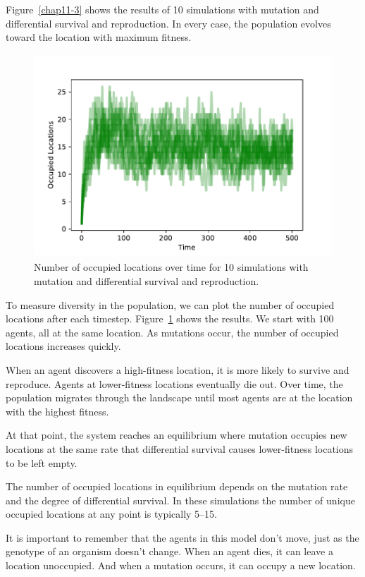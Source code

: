 \documentclass[12pt]{book}
\theoremstyle{exercise}
\begin{document}
Figure~\ref{chap11-3} shows the results of 10 simulations with mutation and differential survival and reproduction.  In every case, the population evolves toward the location with maximum fitness.

\begin{figure}
\centerline{\includegraphics[height=3in]{figs/chap11-4.pdf}}
\caption{Number of occupied locations over time for 10 simulations with mutation and differential survival and reproduction.}
\label{chap11-4}
\end{figure}

To measure diversity in the population, we can plot the number of occupied locations after each timestep.  Figure~\ref{chap11-4} shows the results.  We start with 100 agents, all at the same location.  As mutations occur, the number of occupied locations increases quickly. 

When an agent discovers a high-fitness location, it is more likely to survive and reproduce.  Agents at lower-fitness locations eventually die out.  Over time, the population migrates through the landscape until most agents are at the location with the highest fitness.

At that point, the system reaches an equilibrium where mutation occupies new locations at the same rate that differential survival causes lower-fitness locations to be left empty.

The number of occupied locations in equilibrium depends on the mutation rate and the degree of differential survival.  In these simulations the number of unique occupied locations at any point is typically 5--15.

It is important to remember that the agents in this model don't move, just as the genotype of an organism doesn't change.  When an agent dies, it can leave a location unoccupied.  And when a mutation occurs, it can occupy a new location.
\end{document}
